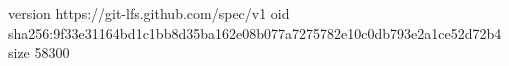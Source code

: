version https://git-lfs.github.com/spec/v1
oid sha256:9f33e31164bd1c1bb8d35ba162e08b077a7275782e10c0db793e2a1ce52d72b4
size 58300
